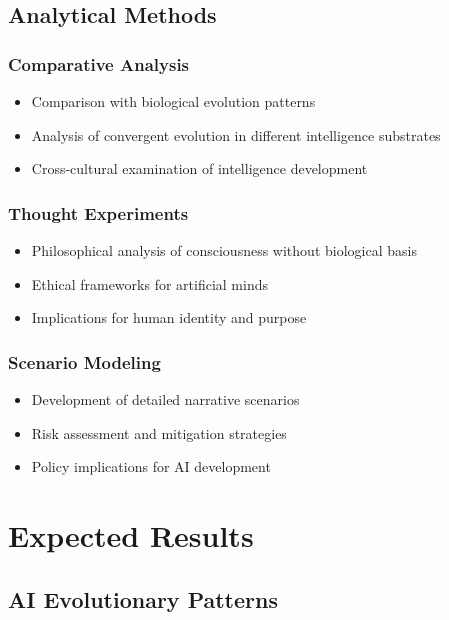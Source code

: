 \documentclass[12pt,a4paper]{article}
\begin{document}
\subsection{Analytical Methods}

\subsubsection{Comparative Analysis}
\begin{itemize}
    \item Comparison with biological evolution patterns
    \item Analysis of convergent evolution in different intelligence substrates
    \item Cross-cultural examination of intelligence development
\end{itemize}

\subsubsection{Thought Experiments}
\begin{itemize}
    \item Philosophical analysis of consciousness without biological basis
    \item Ethical frameworks for artificial minds
    \item Implications for human identity and purpose
\end{itemize}

\subsubsection{Scenario Modeling}
\begin{itemize}
    \item Development of detailed narrative scenarios
    \item Risk assessment and mitigation strategies
    \item Policy implications for AI development
\end{itemize}

\section{Expected Results}

\subsection{AI Evolutionary Patterns}
\end{document}
